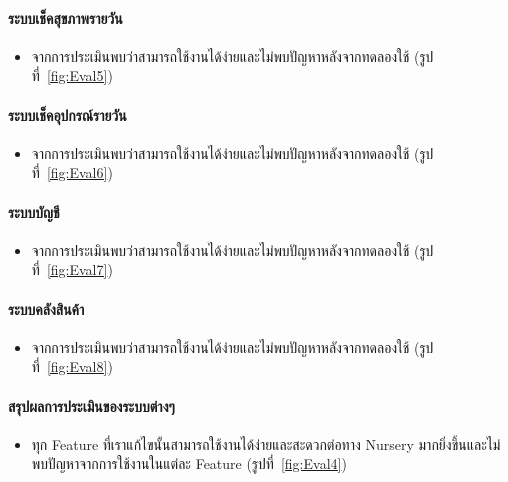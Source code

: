 \paragraph{ระบบเช็คสุขภาพรายวัน}
\begin{itemize}
  \item จากการประเมินพบว่าสามารถใช้งานได้ง่ายและไม่พบปัญหาหลังจากทดลองใช้ (รูปที่~\ref{fig:Eval5})
\end{itemize}
\paragraph{ระบบเช็คอุปกรณ์รายวัน}
\begin{itemize}
  \item จากการประเมินพบว่าสามารถใช้งานได้ง่ายและไม่พบปัญหาหลังจากทดลองใช้ (รูปที่~\ref{fig:Eval6})
\end{itemize}
\paragraph{ระบบบัญชี}
\begin{itemize}
  \item จากการประเมินพบว่าสามารถใช้งานได้ง่ายและไม่พบปัญหาหลังจากทดลองใช้ (รูปที่~\ref{fig:Eval7})
\end{itemize}
\paragraph{ระบบคลังสินค้า}
\begin{itemize}
  \item จากการประเมินพบว่าสามารถใช้งานได้ง่ายและไม่พบปัญหาหลังจากทดลองใช้ (รูปที่~\ref{fig:Eval8})
\end{itemize}
\paragraph{สรุปผลการประเมินของระบบต่างๆ}
\begin{itemize}
  \item ทุก Feature ที่เราแก้ไขนั้นสามารถใช้งานได้ง่ายและสะดวกต่อทาง Nursery มากยิ่งขึ้นและไม่พบปัญหาจากการใช้งานในแต่ละ Feature (รูปที่~\ref{fig:Eval4})
\end{itemize}



